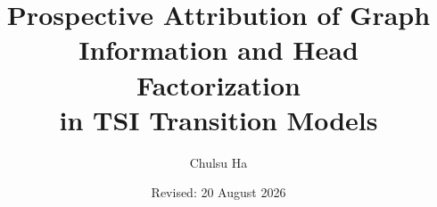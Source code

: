 \documentclass[11pt]{article}
\title{Prospective Attribution of Graph Information and Head Factorization\\in TSI Transition Models}
\author{Chulsu Ha}
\date{Revised: 20 August 2026}
\begin{document}
\maketitle








\begingroup
\raggedright


\endgroup
\end{document}
